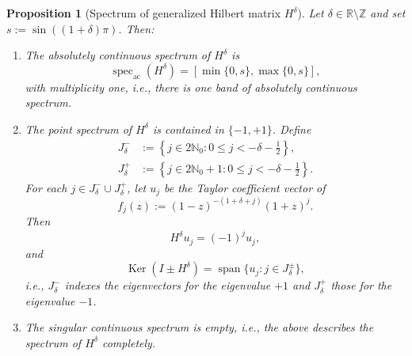 \documentclass[11pt,a4paper,reqno]{amsart}
\newtheorem{proposition}[theorem]{Proposition}
\theoremstyle{remark}
\newcommand{\Nzero}{\mathbb N_0}
\newcommand{\R}{\mathbb R}
\newcommand{\Ker}{\operatorname{Ker}}
\newcommand{\id}{I}
\begin{document}
\begin{proposition}[Spectrum of generalized Hilbert matrix $H^\delta$]\label{prop:spectral-data}
Let $\delta\in\R\setminus\mathbb Z$ and set
$s:=\sin((1+\delta)\pi)$.  Then:

\begin{enumerate}
\item The absolutely continuous spectrum of $H^\delta$ is
\begin{equation}\label{eq:ac-spectrum}
 \operatorname{spec}_{\mathrm{ac}}(H^\delta)
 =[\min\{0,s\},\max\{0,s\}],
\end{equation}
with multiplicity one, i.e., there is one band of absolutely continuous spectrum.

\item The point spectrum of $H^\delta$ is contained in $\{-1,+1\}$.  Define
\begin{align}
 J^-_\delta
 &:=\left\{j\in 2\Nzero:0\leq j<-\delta-\frac12\right\},
 \label{eq:Jminus}\\
 J^+_\delta
 &:=\left\{j\in 2 \Nzero +1:0\leq j<-\delta-\frac12\right\}.
 \label{eq:Jplus}
\end{align}
For each $j\in J^-_\delta \cup J^+_\delta$, let $u_j$ be the Taylor coefficient vector of
\begin{equation}\label{eq:fj}
 f_j(z):=(1-z)^{-(1+\delta+j)}(1+z)^j.
\end{equation}
Then
\begin{equation}\label{eq:eigenvalue-fj}
 H^\delta u_j=(-1)^j u_j,
\end{equation}
and
\begin{equation}\label{eq:kernel-basis}
 \Ker(\id\pm H^\delta)
 =\operatorname{span}\{u_j:j\in J^\pm_\delta\},
\end{equation}
i.e., $J_\delta^-$ indexes the eigenvectors for the eigenvalue $+1$ and
$J_\delta^+$ those for the eigenvalue $-1$.

\item
The singular continuous spectrum is empty, i.e., the above describes the spectrum of $H^\delta$ completely.
\end{enumerate}
\end{proposition}
\end{document}

